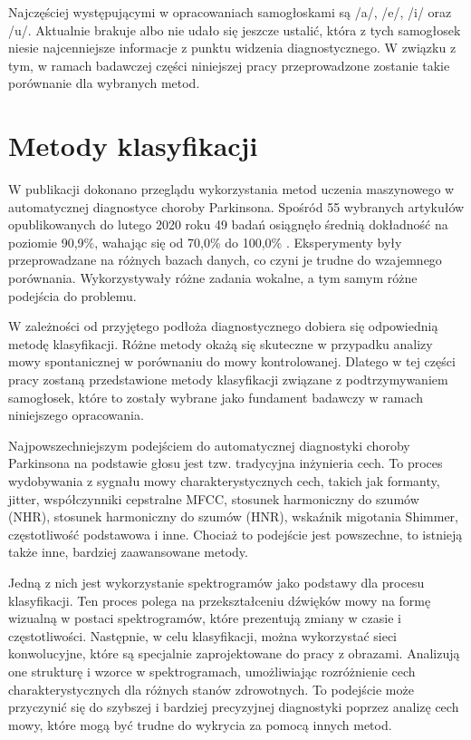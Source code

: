 Najczęściej występującymi w opracowaniach samogłoskami są /a/, /e/, /i/ oraz /u/.
Aktualnie brakuje albo nie udało się jeszcze ustalić, która z tych samogłosek niesie najcenniejsze informacje z punktu widzenia diagnostycznego.
W związku z tym, w ramach badawczej części niniejszej pracy przeprowadzone zostanie takie porównanie dla wybranych metod.

\section{Metody klasyfikacji}\label{sec:metody-klasyfikacji}

W publikacji \cite{ML_for_PD_review} dokonano przeglądu wykorzystania metod uczenia maszynowego w automatycznej diagnostyce choroby Parkinsona.
Spośród 55 wybranych artykułów opublikowanych do lutego 2020 roku 49 badań osiągnęło średnią dokładność na poziomie 90,9\%,
wahając się od 70,0\% \cite{7378178, multimodel-framework} do 100,0\% \cite{new-hybrid, fuzzy-neural-system, linear-discriminant-analysis, dastjerd}.
Eksperymenty były przeprowadzane na różnych bazach danych, co czyni je trudne do wzajemnego porównania.
Wykorzystywały różne zadania wokalne, a tym samym różne podejścia do problemu.

W zależności od przyjętego podłoża diagnostycznego dobiera się odpowiednią metodę klasyfikacji.
Różne metody okażą się skuteczne w przypadku analizy mowy spontanicznej w porównaniu do mowy kontrolowanej.
Dlatego w tej części pracy zostaną przedstawione metody klasyfikacji związane z podtrzymywaniem samogłosek, które to zostały wybrane jako
fundament badawczy w ramach niniejszego opracowania.

Najpowszechniejszym podejściem do automatycznej diagnostyki choroby Parkinsona na podstawie głosu jest tzw. tradycyjna inżynieria cech.
To proces wydobywania z sygnału mowy charakterystycznych cech, takich jak formanty, jitter, współczynniki cepstralne MFCC, stosunek harmoniczny do
szumów (NHR), stosunek harmoniczny do szumów (HNR), wskaźnik migotania Shimmer, częstotliwość podstawowa i inne.
Chociaż to podejście jest powszechne, to istnieją także inne, bardziej zaawansowane metody.

Jedną z nich jest wykorzystanie spektrogramów jako podstawy dla procesu klasyfikacji.
Ten proces polega na przekształceniu dźwięków mowy na formę wizualną w postaci spektrogramów, które prezentują zmiany w czasie i częstotliwości.
Następnie, w celu klasyfikacji, można wykorzystać sieci konwolucyjne, które są specjalnie zaprojektowane do pracy z obrazami.
Analizują one strukturę i wzorce w spektrogramach, umożliwiając rozróżnienie cech charakterystycznych dla różnych stanów zdrowotnych.
To podejście może przyczynić się do szybszej i bardziej precyzyjnej diagnostyki poprzez analizę cech mowy, które mogą być trudne do wykrycia za pomocą
innych metod.

